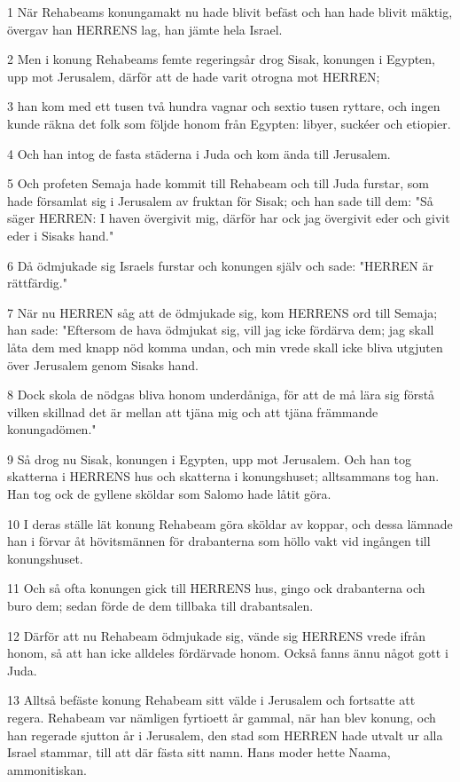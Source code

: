 \par 1 När Rehabeams konungamakt nu hade blivit befäst och han hade blivit mäktig, övergav han HERRENS lag, han jämte hela Israel.
\par 2 Men i konung Rehabeams femte regeringsår drog Sisak, konungen i Egypten, upp mot Jerusalem, därför att de hade varit otrogna mot HERREN;
\par 3 han kom med ett tusen två hundra vagnar och sextio tusen ryttare, och ingen kunde räkna det folk som följde honom från Egypten: libyer, suckéer och etiopier.
\par 4 Och han intog de fasta städerna i Juda och kom ända till Jerusalem.
\par 5 Och profeten Semaja hade kommit till Rehabeam och till Juda furstar, som hade församlat sig i Jerusalem av fruktan för Sisak; och han sade till dem: "Så säger HERREN: I haven övergivit mig, därför har ock jag övergivit eder och givit eder i Sisaks hand."
\par 6 Då ödmjukade sig Israels furstar och konungen själv och sade: "HERREN är rättfärdig."
\par 7 När nu HERREN såg att de ödmjukade sig, kom HERRENS ord till Semaja; han sade: "Eftersom de hava ödmjukat sig, vill jag icke fördärva dem; jag skall låta dem med knapp nöd komma undan, och min vrede skall icke bliva utgjuten över Jerusalem genom Sisaks hand.
\par 8 Dock skola de nödgas bliva honom underdåniga, för att de må lära sig förstå vilken skillnad det är mellan att tjäna mig och att tjäna främmande konungadömen."
\par 9 Så drog nu Sisak, konungen i Egypten, upp mot Jerusalem. Och han tog skatterna i HERRENS hus och skatterna i konungshuset; alltsammans tog han. Han tog ock de gyllene sköldar som Salomo hade låtit göra.
\par 10 I deras ställe lät konung Rehabeam göra sköldar av koppar, och dessa lämnade han i förvar åt hövitsmännen för drabanterna som höllo vakt vid ingången till konungshuset.
\par 11 Och så ofta konungen gick till HERRENS hus, gingo ock drabanterna och buro dem; sedan förde de dem tillbaka till drabantsalen.
\par 12 Därför att nu Rehabeam ödmjukade sig, vände sig HERRENS vrede ifrån honom, så att han icke alldeles fördärvade honom. Också fanns ännu något gott i Juda.
\par 13 Alltså befäste konung Rehabeam sitt välde i Jerusalem och fortsatte att regera. Rehabeam var nämligen fyrtioett år gammal, när han blev konung, och han regerade sjutton år i Jerusalem, den stad som HERREN hade utvalt ur alla Israel stammar, till att där fästa sitt namn. Hans moder hette Naama, ammonitiskan.
